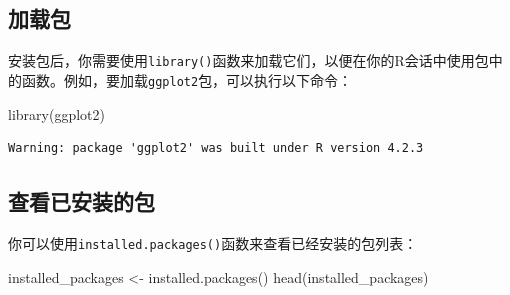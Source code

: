 \documentclass[
  letterpaper,
  DIV=11,
  numbers=noendperiod]{scrreprt}
\newenvironment{Shaded}{\begin{snugshade}}{\end{snugshade}}
\newcommand{\FunctionTok}[1]{\textcolor[rgb]{0.28,0.35,0.67}{#1}}
\newcommand{\NormalTok}[1]{\textcolor[rgb]{0.00,0.23,0.31}{#1}}
\newcommand{\OtherTok}[1]{\textcolor[rgb]{0.00,0.23,0.31}{#1}}
\begin{document}
\hypertarget{ux52a0ux8f7dux5305}{%
\subsection{加载包}\label{ux52a0ux8f7dux5305}}

安装包后，你需要使用\texttt{library()}函数来加载它们，以便在你的R会话中使用包中的函数。例如，要加载\texttt{ggplot2}包，可以执行以下命令：

\begin{Shaded}
\begin{Highlighting}[]
\FunctionTok{library}\NormalTok{(ggplot2)}
\end{Highlighting}
\end{Shaded}

\begin{verbatim}
Warning: package 'ggplot2' was built under R version 4.2.3
\end{verbatim}

\hypertarget{ux67e5ux770bux5df2ux5b89ux88c5ux7684ux5305}{%
\subsection{查看已安装的包}\label{ux67e5ux770bux5df2ux5b89ux88c5ux7684ux5305}}

你可以使用\texttt{installed.packages()}函数来查看已经安装的包列表：

\begin{Shaded}
\begin{Highlighting}[]
\NormalTok{installed\_packages }\OtherTok{\textless{}{-}} \FunctionTok{installed.packages}\NormalTok{()}
\FunctionTok{head}\NormalTok{(installed\_packages)}
\end{Highlighting}
\end{Shaded}
\end{document}
